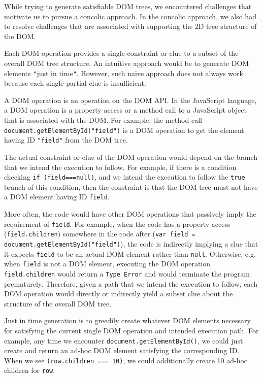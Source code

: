 While trying to generate satisfiable DOM trees, we encountered challenges that motivate us to pursue a concolic approach.  
In the concolic approach, we also had to resolve challenges that are associated with supporting the 2D tree structure of the DOM.  

Each DOM operation provides a single constraint or clue to a subset of the overall DOM tree structure.  An intuitive approach would be to generate DOM elements {\tt "}just in time{\tt "}.  
However, such na\"ive approach does not always work because each single partial clue is insufficient.  

A DOM operation is an operation on the DOM API.  In the JavaScript language, a DOM operation is a property access or a method call to a JavaScript object that is associated with the DOM.  
For example, the method call {\tt document.getElementById("field")} is a DOM operation to get the element having ID {\tt "field"} from the DOM tree.  

The actual constraint or clue of the DOM operation would depend on the branch that we intend the execution to follow.  
For example, if there is a condition checking {\tt if (field===null)}, and we intend the execution to follow the {\tt true} branch of this condition,  
then the constraint is that the DOM tree must not have a DOM element having ID {\tt field}.  

More often, the code would have other DOM operations that passively imply the requirement of {\tt field}.  
For example, when the code has a property access ({\tt field.children}) somewhere in the code after ({\tt var field = document.getElementById("field")}), 
the code is indirectly implying a clue that it expects {\tt field} to be an actual DOM element rather than {\tt null}.  
Otherwise, e.g. when {\tt field} is not a DOM element, executing the DOM operation {\tt field.children} would return a {\tt Type Error} and would terminate the program prematurely.    
Therefore, given a path that we intend the execution to follow, each DOM operation would directly or indirectly yield a subset clue about the structure of the overall DOM tree.  

Just in time generation is to greedily create whatever DOM elements necessary for satisfying the current single DOM operation and intended execution path.    
For example, any time we encounter {\tt document.getElementById()}, we could just create and return an ad-hoc DOM element satisfying the corresponding ID.  
When we see {\tt (row.children === 10)}, we could additionally create 10 ad-hoc children for {\tt row}.  

